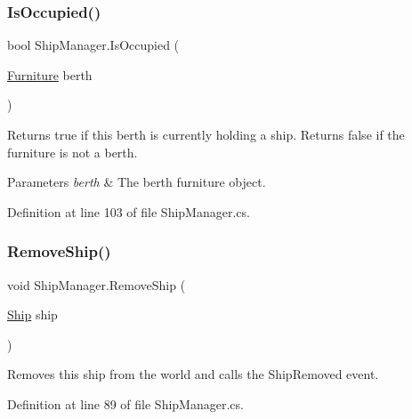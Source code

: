 \mbox{\label{class_ship_manager_a1a97c84b3ac0c958fbf1f11f9d04d16b}} 
\subsubsection{\texorpdfstring{Is\+Occupied()}{IsOccupied()}}
{\footnotesize\ttfamily bool Ship\+Manager.\+Is\+Occupied (\begin{DoxyParamCaption}\item[{\hyperlink{class_furniture}{Furniture}}]{berth }\end{DoxyParamCaption})}



Returns true if this berth is currently holding a ship. Returns false if the furniture is not a berth. 


\begin{DoxyParams}{Parameters}
{\em berth} & The berth furniture object.\\
\hline
\end{DoxyParams}


Definition at line 103 of file Ship\+Manager.\+cs.

\mbox{\label{class_ship_manager_a8a9fa6ebfb1f8f059f1776d620658808}} 
\subsubsection{\texorpdfstring{Remove\+Ship()}{RemoveShip()}}
{\footnotesize\ttfamily void Ship\+Manager.\+Remove\+Ship (\begin{DoxyParamCaption}\item[{\hyperlink{class_ship}{Ship}}]{ship }\end{DoxyParamCaption})}



Removes this ship from the world and calls the Ship\+Removed event. 



Definition at line 89 of file Ship\+Manager.\+cs.

\mbox{\label{class_ship_manager_a9dbbc387497ab2f4fc7c90cde65dfd4d}} 
